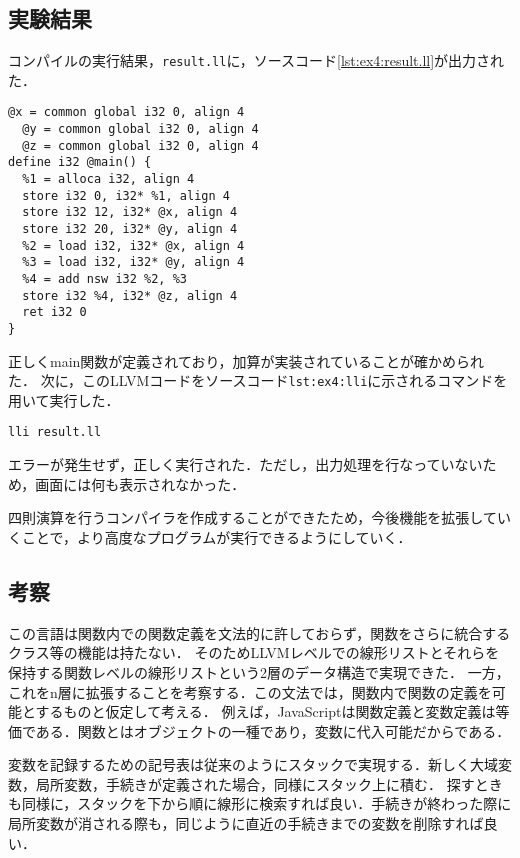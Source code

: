 \documentclass[uplatex]{jsarticle}
\begin{document}
\subsection{実験結果}
コンパイルの実行結果，\verb#result.ll#に，ソースコード\ref{lst:ex4:result.ll}が出力された．

\begin{lstlisting}[caption=result.ll,label=lst:ex4:result.ll]
  @x = common global i32 0, align 4
  @y = common global i32 0, align 4
  @z = common global i32 0, align 4
define i32 @main() {
  %1 = alloca i32, align 4
  store i32 0, i32* %1, align 4
  store i32 12, i32* @x, align 4
  store i32 20, i32* @y, align 4
  %2 = load i32, i32* @x, align 4
  %3 = load i32, i32* @y, align 4
  %4 = add nsw i32 %2, %3
  store i32 %4, i32* @z, align 4
  ret i32 0
}

\end{lstlisting}

正しくmain関数が定義されており，加算が実装されていることが確かめられた．
次に，このLLVMコードをソースコード\verb#lst:ex4:lli#に示されるコマンドを用いて実行した．
\begin{lstlisting}[caption=parserコマンド,label=lst:ex4:lli]
lli result.ll
\end{lstlisting}

エラーが発生せず，正しく実行された．ただし，出力処理を行なっていないため，画面には何も表示されなかった．

四則演算を行うコンパイラを作成することができたため，今後機能を拡張していくことで，より高度なプログラムが実行できるようにしていく．

\subsection{考察}

この言語は関数内での関数定義を文法的に許しておらず，関数をさらに統合するクラス等の機能は持たない．
そのためLLVMレベルでの線形リストとそれらを保持する関数レベルの線形リストという2層のデータ構造で実現できた．
一方，これをn層に拡張することを考察する．この文法では，関数内で関数の定義を可能とするものと仮定して考える．
例えば，JavaScriptは関数定義と変数定義は等価である．関数とはオブジェクトの一種であり，変数に代入可能だからである．

変数を記録するための記号表は従来のようにスタックで実現する．新しく大域変数，局所変数，手続きが定義された場合，同様にスタック上に積む．
探すときも同様に，スタックを下から順に線形に検索すれば良い．手続きが終わった際に局所変数が消される際も，同じように直近の手続きまでの変数を削除すれば良い．
\end{document}
